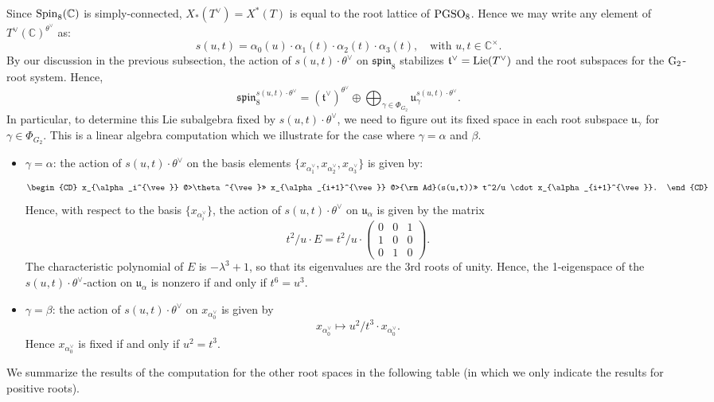 \documentclass[11pt]{amsart}
\theoremstyle{plain}
\numberwithin{equation}{section}
\newcommand{\C}{\mathbb C}
\def\PGSO{{\rm PGSO}}
\def\Spin{{\rm Spin}}
\def\Spin{{\rm Spin}}
\def\C{{\bf C}}
\def\C{{\mathbb C}}
\begin{document}
 Since $\Spin_8(\C)$ is simply-connected, $X_*(T^{\vee}) = X^*(T)$ is equal to the root lattice of $\PGSO_8$.
Hence we may write any element of $T^{\vee}(\C)^{\theta^{\vee}}$ as:  
 \begin{equation} \label{E:torus}   s(u,t) =\alpha_0(u) \cdot  \alpha_1(t) \cdot \alpha_2(t) \cdot \alpha_3(t) , \quad \text{with $u, t \in \C^{\times}$.} \end{equation}
 By our discussion in the previous subsection, the action of $s(u,t) \cdot \theta^{\vee}$ on $\mathfrak{spin}_8$ stabilizes $\mathfrak{t}^{\vee} = {\rm Lie}(T^{\vee})$ and 
 the root subspaces for the ${\rm G}_2$-root system.
  Hence,
  \[  \mathfrak{spin}_8^{s(u,t) \cdot \theta^{\vee}}
= (\mathfrak{t}^{\vee})^{\theta^{\vee}} \oplus \bigoplus_{\gamma \in \Phi_{G_2}}  \mathfrak{u}_{\gamma}^{s(u,t) \cdot \theta^{\vee}}. \]
 In particular, to determine this Lie subalgebra fixed by $s(u,t) \cdot \theta^{\vee}$, we need to figure out its fixed space in each root subspace $\mathfrak{u}_{\gamma}$ for $\gamma \in \Phi_{G_2}$. This is a linear algebra computation which we illustrate for the case where $\gamma = \alpha$ and $\beta$. 
 \vskip 5pt
 
 \begin{itemize}
 \item $\gamma= \alpha$: the action of $s(u,t) \cdot \theta^{\vee}$ on the basis elements $\{x_{\alpha_1^{\vee}}, x_{\alpha_2^{\vee}}, x_{\alpha_3^{\vee}} \}$ is given by:
 \[  \begin{CD}
 x_{\alpha_i^{\vee}}  @>\theta^{\vee}>> x_{\alpha_{i+1}^{\vee}} @>{\rm Ad}(s(u,t))>>  t^2/u \cdot x_{\alpha_{i+1}^{\vee}}. \end{CD} \]
 Hence, with respect to the basis $\{x_{\alpha_i^{\vee}} \}$, the action of $s(u,t) \cdot \theta^{\vee}$ on $\mathfrak{u}_{\alpha}$ is given by the matrix 
 \[  t^2/u \cdot  E = t^2/u \cdot \left( \begin{array}{ccc}
 0 &0 & 1 \\
 1 & 0 & 0 \\
 0 & 1 & 0 \end{array} \right). \]
 The characteristic polynomial of $E$ is $-\lambda^3 +1$, so that its eigenvalues are the 3rd roots of unity. Hence, the 1-eigenspace of the $s(u,t) \cdot \theta^{\vee}$-action on  $\mathfrak{u}_{\alpha}$ is nonzero if and only if $t^6 =u^3$. 
 
 \vskip 5pt
 
 \item $\gamma = \beta$: the action of $s(u,t) \cdot \theta^{\vee}$ on $x_{\alpha_0^{\vee}}$ is given by
 \[  x_{\alpha_0^{\vee}} \mapsto u^2/t^3 \cdot x_{\alpha_0^{\vee}}. \]
 Hence $x_{\alpha_0^{\vee}}$ is fixed if and only if $u^2 = t^3$. 
  \end{itemize}
 We summarize the results of the computation for the other root spaces in the following table (in which we only indicate the results for positive roots). 
 \vskip 10pt
 
\end{document}
